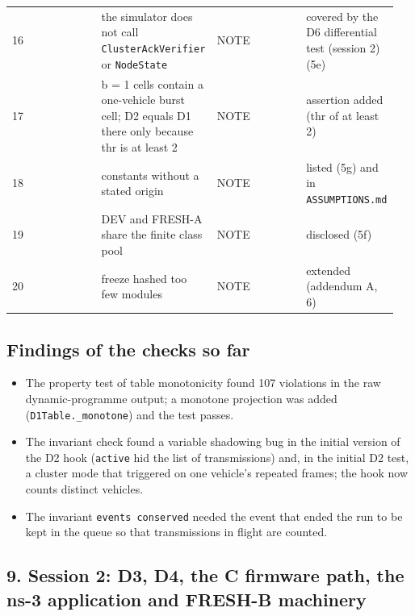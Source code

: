 {\begin{longtable}{p{0.237\linewidth}p{0.237\linewidth}p{0.237\linewidth}p{0.237\linewidth}}
16 & the simulator does not call \texttt{ClusterAckVerifier} or \texttt{NodeState} & NOTE & covered by the D6 differential test (session 2) (5e) \\
17 & b = 1 cells contain a one-vehicle burst cell; D2 equals D1 there only because thr is at least 2 & NOTE & assertion added (thr of at least 2) \\
18 & constants without a stated origin & NOTE & listed (5g) and in \texttt{ASSUMPTIONS.md} \\
19 & DEV and FRESH-A share the finite class pool & NOTE & disclosed (5f) \\
20 & freeze hashed too few modules & NOTE & extended (addendum A, 6) \\
\bottomrule
\end{longtable}}

\subsection*{Findings of the checks so far}

\begin{itemize}
\item The property test of table monotonicity found 107 violations in the raw dynamic-programme output; a monotone projection was added (\texttt{D1Table.\_monotone}) and the test passes.
\item The invariant check found a variable shadowing bug in the initial version of the D2 hook (\texttt{active} hid the list of transmissions) and, in the initial D2 test, a cluster mode that triggered on one vehicle's repeated frames; the hook now counts distinct vehicles.
\item The invariant \texttt{events conserved} needed the event that ended the run to be kept in the queue so that transmissions in flight are counted.
\end{itemize}


\subsection*{9. Session 2: D3, D4, the C firmware path, the ns-3 application and FRESH-B machinery}

